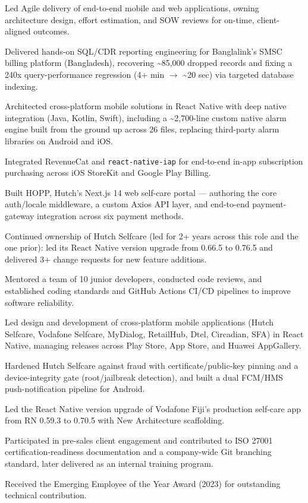 \documentclass[10.5pt]{article}
\begin{document}
\begin{cvitems}
  \item Led Agile delivery of end-to-end mobile and web applications, owning architecture design, effort estimation, and SOW reviews for on-time, client-aligned outcomes.
  \item Delivered hands-on SQL/CDR reporting engineering for Banglalink's SMSC billing platform (Bangladesh), recovering \textasciitilde85,000 dropped records and fixing a 240x query-performance regression (4+ min $\rightarrow$ \textasciitilde20 sec) via targeted database indexing.
  \item Architected cross-platform mobile solutions in React Native with deep native integration (Java, Kotlin, Swift), including a \textasciitilde2,700-line custom native alarm engine built from the ground up across 26 files, replacing third-party alarm libraries on Android and iOS.
  \item Integrated RevenueCat and \texttt{react-native-iap} for end-to-end in-app subscription purchasing across iOS StoreKit and Google Play Billing.
  \item Built HOPP, Hutch's Next.js 14 web self-care portal --- authoring the core auth/locale middleware, a custom Axios API layer, and end-to-end payment-gateway integration across six payment methods.
  \item Continued ownership of Hutch Selfcare (led for 2+ years across this role and the one prior): led its React Native version upgrade from 0.66.5 to 0.76.5 and delivered 3+ change requests for new feature additions.
  \item Mentored a team of 10 junior developers, conducted code reviews, and established coding standards and GitHub Actions CI/CD pipelines to improve software reliability.
\end{cvitems}

\begin{cvitems}
  \item Led design and development of cross-platform mobile applications (Hutch Selfcare, Vodafone Selfcare, MyDialog, RetailHub, Dtel, Circadian, SFA) in React Native, managing releases across Play Store, App Store, and Huawei AppGallery.
  \item Hardened Hutch Selfcare against fraud with certificate/public-key pinning and a device-integrity gate (root/jailbreak detection), and built a dual FCM/HMS push-notification pipeline for Android.
  \item Led the React Native version upgrade of Vodafone Fiji's production self-care app from RN 0.59.3 to 0.70.5 with New Architecture scaffolding.
  \item Participated in pre-sales client engagement and contributed to ISO 27001 certification-readiness documentation and a company-wide Git branching standard, later delivered as an internal training program.
  \item Received the Emerging Employee of the Year Award (2023) for outstanding technical contribution.
\end{cvitems}
\end{document}

